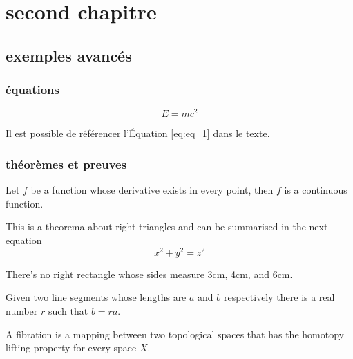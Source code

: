 \chapter{second chapitre}

\section{exemples avancés}

\subsection{équations}

\begin{equation}
  \label{eq:eq_1}
  E=mc^2
\end{equation}

Il est possible de référencer l'Équation \ref{eq:eq_1} dans le texte.

\subsection{théorèmes et preuves}

\begin{theorem}
  \label{theo:theo_1}
  Let $f$ be a function whose derivative exists in every point, then $f$ is
  a continuous function.
\end{theorem}

\begin{theorem}
  \label{theo:theo_2}
  This is a theorema about right triangles and can be summarised in the next
  equation
  \[ x^2 + y^2 = z^2 \]
\end{theorem}

\begin{corollary}
  \label{coro:coro_1}
  There's no right rectangle whose sides measure 3cm, 4cm, and 6cm.
\end{corollary}

\begin{lemma}
  \label{lem:lem_1}
  Given two line segments whose lengths are $a$ and $b$ respectively there
  is a real number $r$ such that $b=ra$.
\end{lemma}

\begin{definition}[Fibration]
  \label{def:def_1}
  A fibration is a mapping between two topological spaces that has the homotopy lifting property for every space $X$.
\end{definition}

